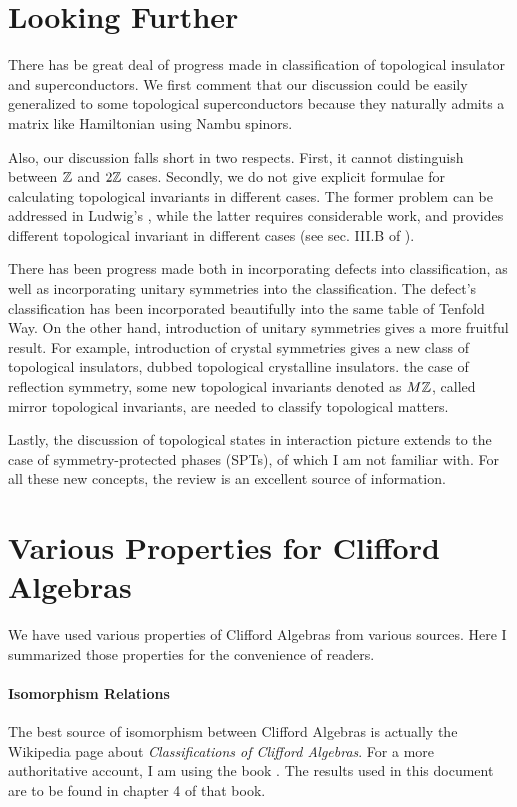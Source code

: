 \documentclass{article}
\begin{document}
\section{Looking Further}
\label{sec:Looking Further}
There has be great deal of progress made in classification of topological
insulator and superconductors. We first comment that our discussion could be
easily generalized to some topological superconductors because they naturally
admits a matrix like Hamiltonian using Nambu spinors.

Also, our discussion falls short in two respects. First, it cannot distinguish
between $\mathbb{Z}$ and $2\mathbb{Z}$ cases. Secondly, we do not give explicit formulae for
calculating topological invariants in different cases. The former problem can be
addressed in Ludwig's \cite{Schnyder2008}, while the latter requires
considerable work, and provides different topological invariant in different
cases (see sec. III.B of \cite{Chiu2016}).

There has been progress made both in incorporating defects into classification,
as well as incorporating unitary symmetries into the classification. The
defect's classification has been incorporated beautifully into the same table of
Tenfold Way. On the other hand, introduction of unitary symmetries gives a more
fruitful result. For example, introduction of crystal symmetries gives a new
class of topological insulators, dubbed topological crystalline
insulators.\cite{Ando2015} the case of reflection symmetry, some new topological
invariants denoted as $M\mathbb{Z}$, called mirror topological invariants, are needed to
classify topological matters\cite{Chiu2013}.

Lastly, the discussion of topological states in interaction picture extends to
the case of symmetry-protected phases (SPTs), of which I am not familiar with.
For all these new concepts, the review \cite{Chiu2016} is an excellent source of
information.

\section{Various Properties for Clifford Algebras}
\label{sec:Various Properties for Clifford Algebras}
We have used various properties of Clifford Algebras from various sources. Here
I summarized those properties for the convenience of readers.

\paragraph{Isomorphism Relations}
The best source of isomorphism between Clifford Algebras is actually the
Wikipedia page about \textit{Classifications of Clifford Algebras}. For a more
authoritative account, I am using the book \cite{VazJayme2016}. The results
used in this document are to be found in chapter 4 of that book.
\end{document}

